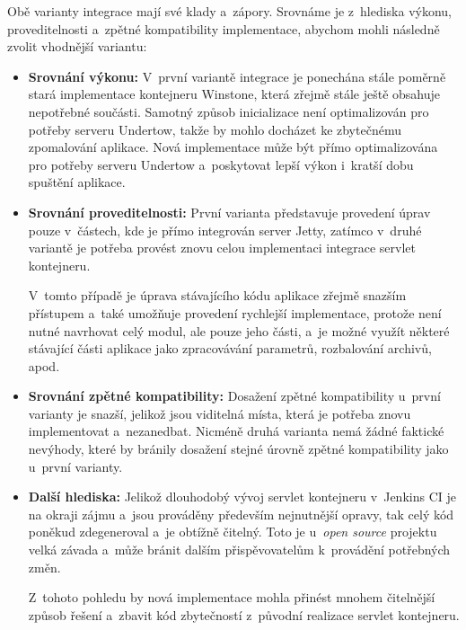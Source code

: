             \noindent Obě varianty integrace mají své klady a~zápory. 
            Srovnáme je z~hlediska výkonu, proveditelnosti a~zpětné kompatibility
            implementace, abychom mohli následně zvolit vhodnější variantu:

            \begin{itemize}
                \item{\textbf{Srovnání výkonu:} V~první variantě integrace je ponechána stále
                 poměrně stará implementace kontejneru Winstone, která zřejmě stále ještě
                 obsahuje nepotřebné součásti. Samotný způsob inicializace není optimalizován
                 pro potřeby serveru Undertow, takže by mohlo docházet ke zbytečnému
                 zpomalování aplikace.
                 Nová implementace může být přímo optimalizována pro potřeby 
                 serveru Undertow a~poskytovat lepší výkon i~kratší dobu spuštění aplikace.}

                \item{\textbf{Srovnání proveditelnosti:} První varianta představuje provedení 
                    úprav pouze v~částech, kde je přímo integrován server Jetty, 
                    zatímco v~druhé variantě je potřeba provést znovu celou implementaci
                    integrace servlet kontejneru. 
                                         
                    V~tomto případě je úprava stávajícího kódu aplikace
                    zřejmě snazším přístupem a~také umožňuje provedení rychlejší
                    implementace, protože není nutné navrhovat celý modul,
                    ale pouze jeho části, a~je možné využít některé stávající části aplikace
                    jako zpracovávání parametrů, rozbalování archivů, apod.}

                \item{\textbf{Srovnání zpětné kompatibility:} Dosažení zpětné kompatibility
                    u~první varianty je snazší, jelikož jsou viditelná místa, která je 
                    potřeba znovu implementovat a~nezanedbat. Nicméně druhá varianta
                    nemá žádné faktické nevýhody, které by bránily dosažení 
                    stejné úrovně zpětné kompatibility jako u~první varianty.}

                \item{\textbf{Další hlediska:} Jelikož dlouhodobý vývoj servlet kontejneru
                    v~Jenkins CI je na okraji zájmu a~jsou prováděny především nejnutnější opravy, 
                    tak celý kód poněkud zdegeneroval a~je obtížně čitelný. Toto
                    je u~\emph{open source} projektu velká závada 
                    a~může bránit dalším přispěvovatelům k~provádění potřebných změn.

                    Z~tohoto pohledu by nová implementace mohla přinést mnohem čitelnější
                    způsob řešení a~zbavit kód zbytečností z~původní realizace servlet kontejneru.}
            \end{itemize}



